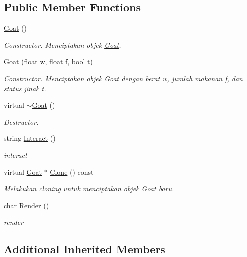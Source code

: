 \subsection*{Public Member Functions}
\begin{DoxyCompactItemize}
\item 
\hyperlink{classGoat_acf506b76c8503c9749df191a92dc99f9}{Goat} ()
\begin{DoxyCompactList}\small\item\em Constructor. Menciptakan objek \hyperlink{classGoat}{Goat}. \end{DoxyCompactList}\item 
\hyperlink{classGoat_a4b0531179ba8082e4123d1534578e226}{Goat} (float w, float f, bool t)
\begin{DoxyCompactList}\small\item\em Constructor. Menciptakan objek \hyperlink{classGoat}{Goat} dengan berat w, jumlah makanan f, dan status jinak t. \end{DoxyCompactList}\item 
virtual \hyperlink{classGoat_a47af45317eec8718356b20a10e31af27}{$\sim$\+Goat} ()
\begin{DoxyCompactList}\small\item\em Destructor. \end{DoxyCompactList}\item 
string \hyperlink{classGoat_a5f480d88c50724cee8c7a9d18f486144}{Interact} ()
\begin{DoxyCompactList}\small\item\em interact \end{DoxyCompactList}\item 
virtual \hyperlink{classGoat}{Goat} $\ast$ \hyperlink{classGoat_a1532200ef20734bb42d0a1306b14d8ad}{Clone} () const 
\begin{DoxyCompactList}\small\item\em Melakukan cloning untuk menciptakan objek \hyperlink{classGoat}{Goat} baru. \end{DoxyCompactList}\item 
char \hyperlink{classGoat_aedea4680fe17571c2f51d35b90397f6e}{Render} ()
\begin{DoxyCompactList}\small\item\em render \end{DoxyCompactList}\end{DoxyCompactItemize}
\subsection*{Additional Inherited Members}



